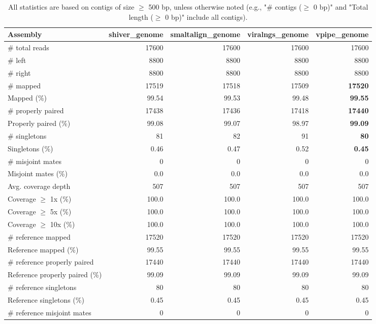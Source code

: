 \documentclass[12pt,a4paper]{article}
\begin{document}
\begin{table}[ht]
\begin{center}
\caption{All statistics are based on contigs of size $\geq$ 500 bp, unless otherwise noted (e.g., "\# contigs ($\geq$ 0 bp)" and "Total length ($\geq$ 0 bp)" include all contigs).}
\begin{tabular}{|l*{4}{|r}|}
\hline
Assembly & shiver\_genome & smaltalign\_genome & viralngs\_genome & vpipe\_genome \\ \hline
\# total reads & 17600 & 17600 & 17600 & 17600 \\ \hline
\# left & 8800 & 8800 & 8800 & 8800 \\ \hline
\# right & 8800 & 8800 & 8800 & 8800 \\ \hline
\# mapped & 17519 & 17518 & 17509 & {\bf 17520} \\ \hline
Mapped (\%) & 99.54 & 99.53 & 99.48 & {\bf 99.55} \\ \hline
\# properly paired & 17438 & 17436 & 17418 & {\bf 17440} \\ \hline
Properly paired (\%) & 99.08 & 99.07 & 98.97 & {\bf 99.09} \\ \hline
\# singletons & 81 & 82 & 91 & {\bf 80} \\ \hline
Singletons (\%) & 0.46 & 0.47 & 0.52 & {\bf 0.45} \\ \hline
\# misjoint mates & 0 & 0 & 0 & 0 \\ \hline
Misjoint mates (\%) & 0.0 & 0.0 & 0.0 & 0.0 \\ \hline
Avg. coverage depth & 507 & 507 & 507 & 507 \\ \hline
Coverage $\geq$ 1x (\%) & 100.0 & 100.0 & 100.0 & 100.0 \\ \hline
Coverage $\geq$ 5x (\%) & 100.0 & 100.0 & 100.0 & 100.0 \\ \hline
Coverage $\geq$ 10x (\%) & 100.0 & 100.0 & 100.0 & 100.0 \\ \hline
\# reference mapped & 17520 & 17520 & 17520 & 17520 \\ \hline
Reference mapped (\%) & 99.55 & 99.55 & 99.55 & 99.55 \\ \hline
\# reference properly paired & 17440 & 17440 & 17440 & 17440 \\ \hline
Reference properly paired (\%) & 99.09 & 99.09 & 99.09 & 99.09 \\ \hline
\# reference singletons & 80 & 80 & 80 & 80 \\ \hline
Reference singletons (\%) & 0.45 & 0.45 & 0.45 & 0.45 \\ \hline
\# reference misjoint mates & 0 & 0 & 0 & 0 \\ \hline

\end{tabular}
\end{center}
\end{table}
\end{document}
